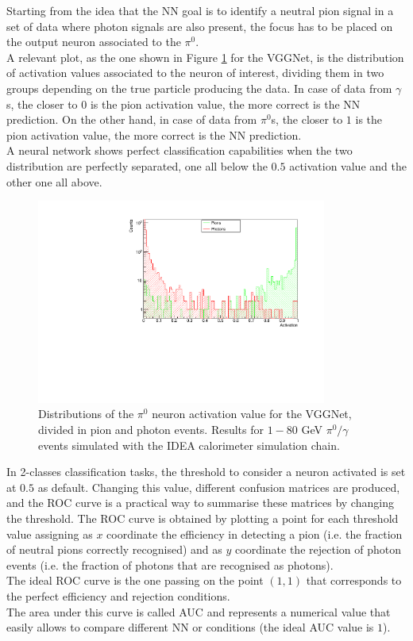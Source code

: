 Starting from the idea that the NN goal is to identify a neutral pion signal in a set of data where photon signals are also present, the focus has to be placed on the output neuron associated to the $\pi^0$.\\
A relevant plot, as the one shown in Figure \ref{fig:VGG_hist_pi} for the VGGNet, is the distribution of activation values associated to the neuron of interest, dividing them in two groups depending on the true particle producing the data.
In case of data from $\gamma$s, the closer to $0$ is the pion activation value, the more correct is the NN prediction.
On the other hand, in case of data from $\pi^0$s, the closer to $1$ is the pion activation value, the more correct is the NN prediction.\\
A neural network shows perfect classification capabilities when the two distribution are perfectly separated, one all below the $0.5$ activation value and the other one all above.\\

\begin{figure}
	\centering
	\includegraphics[width=0.85\textwidth]{IMG/Cap6/Res_hist_pi.pdf}
	\caption{Distributions of the $\pi^0$ neuron activation value for the VGGNet, divided in pion and photon events. Results for $1-80$ GeV $\pi^0/\gamma$ events simulated with the IDEA calorimeter simulation chain.}
	\label{fig:VGG_hist_pi}
\end{figure}

In 2-classes classification tasks, the threshold to consider a neuron activated is set at $0.5$ as default. Changing this value, different confusion matrices are produced, and the ROC curve is a practical way to summarise these matrices by changing the threshold. The ROC curve is obtained by plotting a point for each threshold value assigning as $x$ coordinate the efficiency in detecting a pion (i.e. the fraction of neutral pions correctly recognised) and as $y$ coordinate the rejection of photon events (i.e. the fraction of photons that are recognised as photons).\\
The ideal ROC curve is the one passing on the point $(1,1)$ that corresponds to the perfect efficiency and rejection conditions.\\
The area under this curve is called AUC and represents a numerical value that easily allows to compare different NN or conditions (the ideal AUC value is $1$).\\

